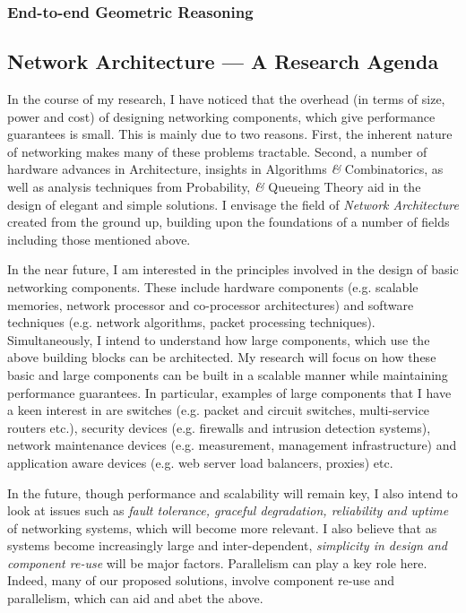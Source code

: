 \documentclass[a4paper, 10pt]{article}
\begin{document}
\subsubsection*{End-to-end Geometric Reasoning}

\subsection*{Network Architecture ---  A Research Agenda}

   In the course of my research, I have noticed that the overhead (in terms
of size, power and cost) of designing networking components, which give 
performance guarantees is small. 
This is mainly due to two reasons. First, the inherent nature of 
networking makes many of these problems tractable. Second, a number of
hardware advances in Architecture, insights in Algorithms {\it \&} Combinatorics, 
as well as analysis techniques from Probability, {\it \&} Queueing Theory 
aid in the design of elegant and simple solutions.
I envisage the field of {\it Network Architecture} created from the 
ground up, building upon the foundations of a number of fields
including those mentioned above.


In the near future, I am interested in the 
principles involved in the design of basic networking 
components. These include
hardware components (e.g. scalable memories, 
network processor and co-processor architectures) and 
software techniques (e.g. network algorithms, packet processing 
techniques). 
  Simultaneously, I intend to understand how large components, which use
the above building blocks can be architected.
My research will focus on how these basic and large
components can be built in a scalable manner while maintaining 
performance guarantees. 
In particular, examples of large components that I have a keen
interest in are switches 
(e.g. packet and circuit switches, multi-service routers etc.), 
security devices (e.g. firewalls and intrusion detection 
systems), network maintenance devices (e.g. measurement,
management infrastructure) and application aware devices
(e.g. web server load balancers, proxies) etc. 


 In the future, though performance and scalability will remain key,
I also intend to look at issues such as {\it fault tolerance, graceful degradation,
reliability and uptime} of networking systems, which will become more relevant. 
I also believe that as systems become increasingly large and 
inter-dependent, {\it simplicity in design and component 
re-use} will be major factors.
Parallelism can play a key role here.
Indeed, many of our proposed solutions, involve component re-use and 
parallelism, which can aid and abet the above.
\end{document}
